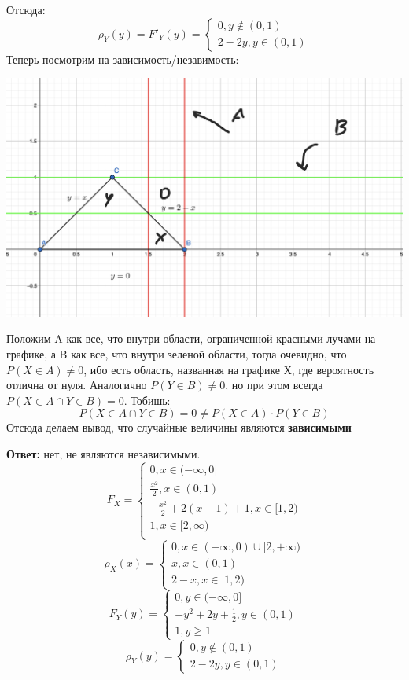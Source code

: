 \documentclass[a4paper,12pt]{article}
\begin{document}
Отсюда:
\[
\rho_Y(y) = F'_Y(y) = \begin{cases}
0,  y \notin (0, 1) \\
2 - 2y, y \in (0, 1)
\end{cases}
\]
\clearpage
Теперь посмотрим на зависимость/незавимость:
\begin{center}
\includegraphics[scale=0.3]{2.png}
\end{center}
 Положим A как все, что внутри области, ограниченной красными лучами на графике, а B как все, что внутри зеленой области, тогда очевидно, что $P(X \in A) \neq 0$, ибо есть область, названная на графике Х, где вероятность отлична от нуля. Аналогично $P(Y \in B) \neq 0$, но при этом всегда $P(X \in A \cap Y \in B) = 0$. Тобишь:
\[
P(X \in A \cap Y \in B) = 0 \neq P(X \in A) \cdot P(Y \in B)
\]
Отсюда делаем вывод, что случайные величины являются \textbf{зависимыми}
\begin{center}
\textbf{Ответ: } нет, не являются независимыми.
\[
F_X = \begin{cases}
0, x \in (-\infty, 0] \\
\frac{x^2}{2}, x \in (0, 1) \\
-\frac{x^2}{2} + 2(x-1) + 1, x \in [1, 2) \\
1, x \in [2, \infty) \\
\end{cases}
\]
\[
\rho_X(x) = \begin{cases}
0, x \in (-\infty, 0) \cup [2, +\infty) \\
x, x \in (0, 1) \\
2 - x, x \in [1, 2)
\end{cases}
\]
\[
F_Y(y) = \begin{cases}
0, y \in (-\infty, 0] \\
-y^2 + 2y + \frac12, y \in (0, 1) \\
1, y \geq 1
\end{cases} 
\]
\[
\rho_Y(y) = \begin{cases}
0,  y \notin (0, 1) \\
2 - 2y, y \in (0, 1)
\end{cases}
\]
\end{center}
\end{document}
